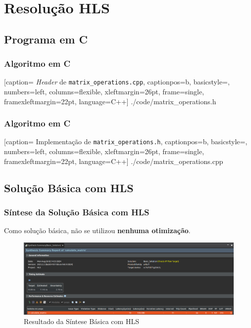 \documentclass{beamer}
\begin{document}
    \section{Resolução HLS}
    \subsection{Programa em C}
    \begin{frame}[fragile]
        \frametitle{Algoritmo em C}

        
        [caption= \textit{Header} de \texttt{matrix\_operations.cpp},
        captionpos=b,
        basicstyle=\tiny,
        numbers=left,
        columns=flexible,
        xleftmargin=26pt,
        frame=single,
        framexleftmargin=22pt,
        language=C++]
        {./code/matrix_operations.h}
    \end{frame}

    \begin{frame}[fragile]
        \frametitle{Algoritmo em C}

        
        [caption= Implementação de \texttt{matrix\_operations.h},
        captionpos=b, 
        basicstyle=\tiny,
        numbers=left,
        columns=flexible,
        xleftmargin=26pt,
        frame=single,
        framexleftmargin=22pt,
        language=C++]
        {./code/matrix_operations.cpp}
    \end{frame}

    \subsection{Solução Básica com HLS}
    \begin{frame}
        \frametitle{Síntese da Solução Básica com HLS}

        \begingroup {}
        Como solução básica,
        não se utilizou \textbf{nenhuma otimização}.
        \endgroup

        \begin{figure}[h] 
            \centering
            \includegraphics[width=1\linewidth]{./images/solutions/HLS_-_Basic_Solution.png}
            \caption{\label{img:syn-hls-basic-solution} Resultado da Síntese Básica com HLS}
          \end{figure}
    \end{frame}
\end{document}
